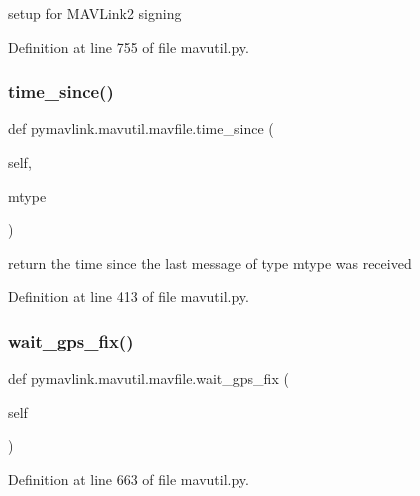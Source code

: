 \begin{DoxyVerb}setup for MAVLink2 signing\end{DoxyVerb}
 

Definition at line 755 of file mavutil.\+py.

\mbox{\label{classpymavlink_1_1mavutil_1_1mavfile_a7749c322285d3e6c03f20b9f5931a9ba}} 
\subsubsection{\texorpdfstring{time\_since()}{time\_since()}}
{\footnotesize\ttfamily def pymavlink.\+mavutil.\+mavfile.\+time\+\_\+since (\begin{DoxyParamCaption}\item[{}]{self,  }\item[{}]{mtype }\end{DoxyParamCaption})}

\begin{DoxyVerb}return the time since the last message of type mtype was received\end{DoxyVerb}
 

Definition at line 413 of file mavutil.\+py.

\mbox{\label{classpymavlink_1_1mavutil_1_1mavfile_a270d661451b79fd6f15c2ffeb42304a6}} 
\subsubsection{\texorpdfstring{wait\_gps\_fix()}{wait\_gps\_fix()}}
{\footnotesize\ttfamily def pymavlink.\+mavutil.\+mavfile.\+wait\+\_\+gps\+\_\+fix (\begin{DoxyParamCaption}\item[{}]{self }\end{DoxyParamCaption})}



Definition at line 663 of file mavutil.\+py.

\mbox{\label{classpymavlink_1_1mavutil_1_1mavfile_a3776d63929d3183a65076cda4930b624}} 
